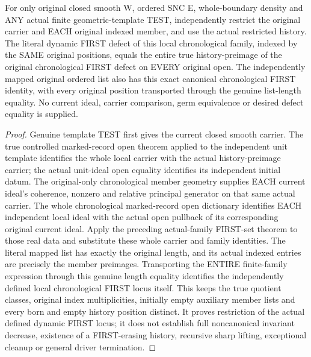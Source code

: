 \begin{theorem}
\label{hir:sharp-original-chronological-distinct-defect-open}
\leanok
For only original closed smooth W, ordered SNC E, whole-boundary density and
ANY actual finite geometric-template TEST, independently restrict the original
carrier and EACH original indexed member, and use the actual restricted history.
The literal dynamic FIRST defect of this local chronological family, indexed
by the SAME original positions, equals the entire true history-preimage of the
original chronological FIRST defect on EVERY original open. The independently mapped original ordered list also has this exact canonical
chronological FIRST identity, with every original position transported through
the genuine list-length equality. No current ideal,
carrier comparison, germ equivalence or desired defect equality is supplied.
\end{theorem}
\begin{proof}
Genuine template TEST first gives the current closed smooth carrier. The true
controlled marked-record open theorem applied to the independent unit template
identifies the whole local carrier with the actual history-preimage carrier;
the actual unit-ideal open equality identifies its independent initial datum.
The original-only chronological member geometry supplies EACH current ideal's
coherence, nonzero and relative principal generator on that same actual carrier.
The whole chronological marked-record open dictionary identifies EACH independent
local ideal with the actual open pullback of its corresponding original current
ideal. Apply the preceding actual-family FIRST-set theorem to those real data
and substitute these whole carrier and family identities. The literal mapped list has exactly the original length, and its actual
indexed entries are precisely the member preimages. Transporting the ENTIRE
finite-family expression through this genuine length equality identifies
the independently defined local chronological FIRST locus itself. This keeps the true
quotient classes, original index multiplicities, initially empty auxiliary
member lists and every born and empty history position distinct. It proves
restriction of the actual defined dynamic FIRST locus; it does not establish
full noncanonical invariant decrease, existence of a FIRST-erasing history,
recursive sharp lifting, exceptional cleanup or general driver termination.
\end{proof}

